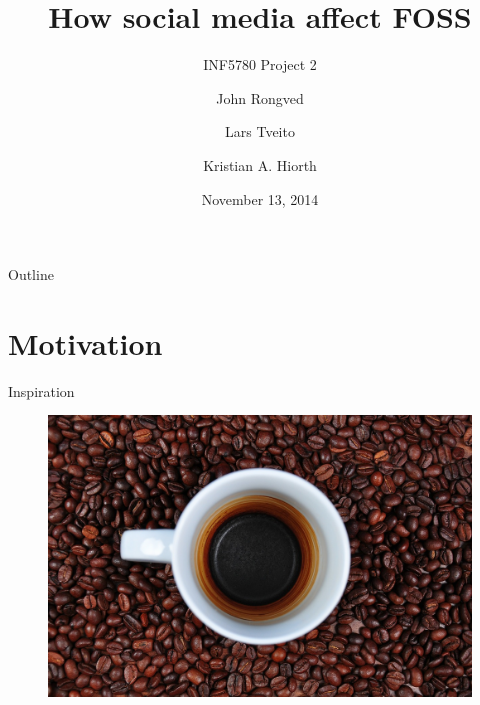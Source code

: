 \documentclass{beamer}
\title{How social media affect FOSS}
\subtitle{INF5780 Project 2}
\author{{John Rongved} \and {Lars Tveito} \and {Kristian A. Hiorth}}
\date{November 13, 2014}
\institute{Department of Informatics\\University of Oslo}
\begin{document}
\begin{frame}
  \titlepage
\end{frame}

\begin{frame}{Outline}
  \tableofcontents{}
\end{frame}

\section{Motivation}


\begin{frame}{Inspiration}
  \begin{figure}
    \includegraphics[width=.6\textwidth]{coffee.jpg}
  \end{figure}
\end{frame}
\end{document}
